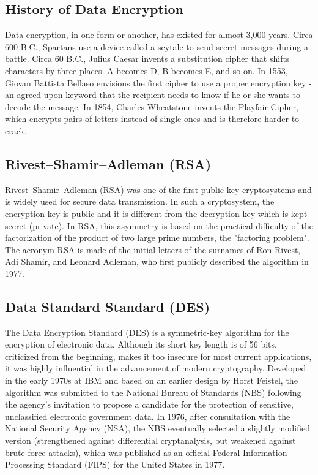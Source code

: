 \documentclass[journal]{IEEEtran}
\begin{document}
\subsection{\textbf{History of Data Encryption}}
Data encryption, in one form or another, has existed for almost 3,000 years. Circa 600 B.C., Spartans use a device called a scytale to send secret messages during a battle. Circa 60 B.C., Julius Caesar invents a substitution cipher that shifts characters by three places. A becomes D, B becomes E, and so on. In 1553, Giovan Battista Bellaso envisions the first cipher to use a proper encryption key - an agreed-upon keyword that the recipient needs to know if he or she wants to decode the message. In 1854, Charles Wheatstone invents the Playfair Cipher, which encrypts pairs of letters instead of single ones and is therefore harder to crack.

\subsection{\textbf{Rivest–Shamir–Adleman (RSA)}}
Rivest–Shamir–Adleman (RSA) was one of the first public-key cryptosystems and is widely used for secure data transmission. In such a cryptosystem, the encryption key is public and it is different from the decryption key which is kept secret (private). In RSA, this asymmetry is based on the practical difficulty of the factorization of the product of two large prime numbers, the "factoring problem". The acronym RSA is made of the initial letters of the surnames of Ron Rivest, Adi Shamir, and Leonard Adleman, who first publicly described the algorithm in 1977. 

\subsection{\textbf{Data Standard Standard (DES)}}
The Data Encryption Standard (DES) is a symmetric-key algorithm for the encryption of electronic data. Although its short key length is of 56 bits, criticized from the beginning, makes it too insecure for most current applications, it was highly influential in the advancement of modern cryptography. Developed in the early 1970s at IBM and based on an earlier design by Horst Feistel, the algorithm was submitted to the National Bureau of Standards (NBS) following the agency's invitation to propose a candidate for the protection of sensitive, unclassified electronic government data. In 1976, after consultation with the National Security Agency (NSA), the NBS eventually selected a slightly modified version (strengthened against differential cryptanalysis, but weakened against brute-force attacks), which was published as an official Federal Information Processing Standard (FIPS) for the United States in 1977.
\end{document}
